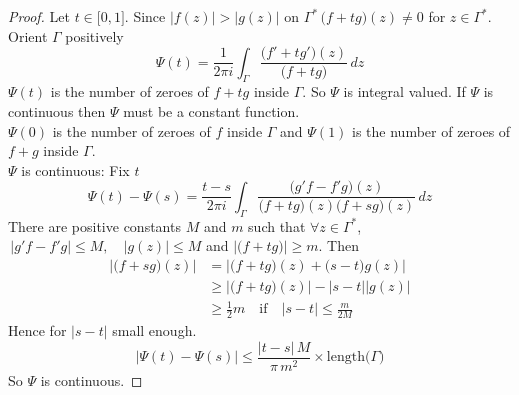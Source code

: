\documentclass[11pt,a4paper]{article}
\theoremstyle{definition}
\begin{document}
\begin{proof}
Let $t\in \big[0, 1\big]$. Since $\left|f(z)\right|>\left|g(z)\right|$ on $\Gamma^*\, \big(f + tg\big) (z) \neq 0$ for $z \in \Gamma^*$. Orient $\Gamma$ positively
$$\Psi (t) = \frac{1}{2\pi i}\int_{\Gamma} \frac{\big(f' + tg'\big)(z)}{\big(f + tg\big)}\,dz$$
$\Psi (t)$ is the number of zeroes of $f + tg$ inside $\Gamma$. So $\Psi$ is integral valued. If $\Psi$ is continuous then $\Psi$ must be a constant function.\\
$\Psi(0)$ is the number of zeroes of $f$ inside $\Gamma$ and $\Psi (1)$ is the number of zeroes of $f + g$ inside $\Gamma$.\\
$\Psi$ is continuous: Fix $t$
$$\Psi (t) - \Psi (s) = \frac{t - s}{2\pi i}\int_{\Gamma}\frac{\big(g'f - f'g\big) (z)}{\big( f + tg\big)(z)\big(f + sg\big)(z)}\,dz$$
There are positive constants $M$ and $m$ such that $\forall z \in \Gamma^*$, $\,\left|g' f - f' g\right|\leq M,\quad  \left|g(z)\right|\leq M$ and $\left|\big(f + tg\big)\right|\geq m$. Then
\begin{align*}
\left|\big(f + sg\big)(z)\right| & = \left|\big(f + tg\big)(z) + \big(s - t\big)g(z)\right|\\
& \geq \left|\big(f + tg\big)(z)\right| - \left|s - t\right|
\left|g(z)\right|\\
& \geq \frac{1}{2}m \quad \text{if}\quad \left|s - t\right|\leq \frac{m}{2M}
\end{align*}
Hence for $\left|s - t\right|$ small enough.
$$\left|\Psi (t) - \Psi (s)\right| \leq \frac{\left|t - s\right|\,M}{\pi\, m^2}\times \text{length}\big(\Gamma\big)$$
So $\Psi$ is continuous.
\end{proof}
\end{document}
